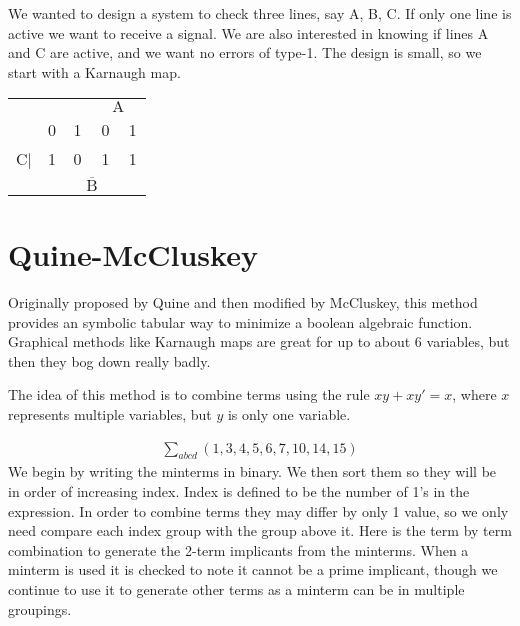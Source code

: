 \begin{example}
We wanted to design a system to check three lines, say A, B, C.  If only one line is active we want to receive a signal.  We are also interested in knowing if lines A and C are active, and we want no errors of type-1.  The design is small, so we start with a Karnaugh map.

\begin{tabular}{r|c|c|c|c|}
\multicolumn{3}{c}{}&\multicolumn{2}{c}{\underline{$\;\;\;\text{A}\;\;\;$}}\\\cline{2-5}
     & 0 & 1 & 0 & 1 \\\cline{2-5}
C$|$ & 1 & 0 & 1 & 1 \\\cline{2-5}
\multicolumn{2}{c}{}&\multicolumn{2}{c}{\vrule height 11pt width 0pt$\overline{\;\;\;\text{B}\;\;\;}$}&\multicolumn{1}{c}{} \\
\end{tabular}
\end{example}

\section{Quine-McCluskey}

Originally proposed by Quine and then modified by McCluskey, this method provides an symbolic tabular way to minimize a boolean algebraic function. Graphical methods like Karnaugh maps are great for up to about 6 variables, but then they bog down really badly.

The idea of this method is to combine terms using the rule $xy+xy' = x$, where $x$ represents multiple variables, but $y$ is only one variable.


\begin{eqnarray}
\sum_{abcd}(1,3,4,5,6,7,10,14,15)
\end{eqnarray}
We begin by writing the minterms in binary.  We then sort them so they will be in order of increasing index. Index is defined to be the number of 1's in the expression.  In order to combine terms they may differ by only 1 value, so we only need compare each index group with the group above it.  Here is the term by term combination to generate the 2-term implicants from the minterms.  When a minterm is used it is checked to note it cannot be a prime implicant, though we continue to use it to generate other terms as a minterm can be in multiple groupings.

